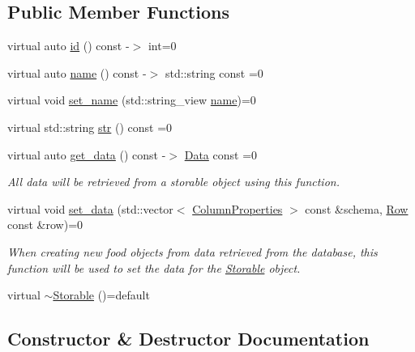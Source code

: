 \subsection*{Public Member Functions}
\begin{DoxyCompactItemize}
\item 
virtual auto \hyperlink{classdatabase_1_1_storable_aafaf8ff3b7a854488ae6d4ab3e39f2af}{id} () const -\/$>$ int=0
\item 
virtual auto \hyperlink{classdatabase_1_1_storable_a404fc104e41b9f1e52090a817c7d317e}{name} () const -\/$>$ std\+::string const =0
\item 
virtual void \hyperlink{classdatabase_1_1_storable_afa3a3acb030d9e33064c2f6e34f8bbcf}{set\+\_\+name} (std\+::string\+\_\+view \hyperlink{classdatabase_1_1_storable_a404fc104e41b9f1e52090a817c7d317e}{name})=0
\item 
virtual std\+::string \hyperlink{classdatabase_1_1_storable_a3502dee26cdad8b8e3b0bf1ebc619dc4}{str} () const =0
\item 
virtual auto \hyperlink{classdatabase_1_1_storable_afb1b1572e1147943227794f8abc0d0b0}{get\+\_\+data} () const -\/$>$ \hyperlink{structdatabase_1_1_data}{Data} const =0
\begin{DoxyCompactList}\small\item\em All data will be retrieved from a storable object using this function. \end{DoxyCompactList}\item 
virtual void \hyperlink{classdatabase_1_1_storable_ae554f871860368677cdb3ba5a490c533}{set\+\_\+data} (std\+::vector$<$ \hyperlink{structdatabase_1_1_column_properties}{Column\+Properties} $>$ const \&schema, \hyperlink{structdatabase_1_1_row}{Row} const \&row)=0
\begin{DoxyCompactList}\small\item\em When creating new food objects from data retrieved from the database, this function will be used to set the data for the \hyperlink{classdatabase_1_1_storable}{Storable} object. \end{DoxyCompactList}\item 
virtual \hyperlink{classdatabase_1_1_storable_a9733fea1c4c7070c915444bd924b0975}{$\sim$\+Storable} ()=default
\end{DoxyCompactItemize}


\subsection{Constructor \& Destructor Documentation}
